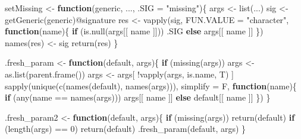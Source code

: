 \documentclass[
]{article}
\newenvironment{Shaded}{\begin{snugshade}}{\end{snugshade}}
\newcommand{\AttributeTok}[1]{\textcolor[rgb]{0.77,0.63,0.00}{#1}}
\newcommand{\ControlFlowTok}[1]{\textcolor[rgb]{0.13,0.29,0.53}{\textbf{#1}}}
\newcommand{\DecValTok}[1]{\textcolor[rgb]{0.00,0.00,0.81}{#1}}
\newcommand{\FunctionTok}[1]{\textcolor[rgb]{0.00,0.00,0.00}{#1}}
\newcommand{\NormalTok}[1]{#1}
\newcommand{\OtherTok}[1]{\textcolor[rgb]{0.56,0.35,0.01}{#1}}
\newcommand{\SpecialCharTok}[1]{\textcolor[rgb]{0.00,0.00,0.00}{#1}}
\newcommand{\StringTok}[1]{\textcolor[rgb]{0.31,0.60,0.02}{#1}}
\begin{document}
\begin{Shaded}
\begin{Highlighting}[]
\NormalTok{setMissing }\OtherTok{\textless{}{-}} 
  \ControlFlowTok{function}\NormalTok{(generic, ..., }\AttributeTok{.SIG =} \StringTok{"missing"}\NormalTok{)\{}
\NormalTok{    args }\OtherTok{\textless{}{-}} \FunctionTok{list}\NormalTok{(...)}
\NormalTok{    sig }\OtherTok{\textless{}{-}} \FunctionTok{getGeneric}\NormalTok{(generic)}\SpecialCharTok{@}\NormalTok{signature}
\NormalTok{    res }\OtherTok{\textless{}{-}} \FunctionTok{vapply}\NormalTok{(sig, }\AttributeTok{FUN.VALUE =} \StringTok{"character"}\NormalTok{,}
                  \ControlFlowTok{function}\NormalTok{(name)\{}
                    \ControlFlowTok{if}\NormalTok{ (}\FunctionTok{is.null}\NormalTok{(args[[ name ]]))}
\NormalTok{                      .SIG}
                    \ControlFlowTok{else}
\NormalTok{                      args[[ name ]]}
\NormalTok{                  \})}
    \FunctionTok{names}\NormalTok{(res) }\OtherTok{\textless{}{-}}\NormalTok{ sig}
    \FunctionTok{return}\NormalTok{(res)}
\NormalTok{  \}}

\NormalTok{.fresh\_param }\OtherTok{\textless{}{-}} 
  \ControlFlowTok{function}\NormalTok{(default, args)\{}
    \ControlFlowTok{if}\NormalTok{ (}\FunctionTok{missing}\NormalTok{(args))}
\NormalTok{      args }\OtherTok{\textless{}{-}} \FunctionTok{as.list}\NormalTok{(}\FunctionTok{parent.frame}\NormalTok{())}
\NormalTok{    args }\OtherTok{\textless{}{-}}\NormalTok{ args[ }\SpecialCharTok{!}\FunctionTok{vapply}\NormalTok{(args, is.name, T) ]}
    \FunctionTok{sapply}\NormalTok{(}\FunctionTok{unique}\NormalTok{(}\FunctionTok{c}\NormalTok{(}\FunctionTok{names}\NormalTok{(default), }\FunctionTok{names}\NormalTok{(args))),}
           \AttributeTok{simplify =}\NormalTok{ F,}
           \ControlFlowTok{function}\NormalTok{(name)\{}
             \ControlFlowTok{if}\NormalTok{ (}\FunctionTok{any}\NormalTok{(name }\SpecialCharTok{==} \FunctionTok{names}\NormalTok{(args)))}
\NormalTok{               args[[ name ]]}
             \ControlFlowTok{else}
\NormalTok{               default[[ name ]]}
\NormalTok{           \})}
\NormalTok{  \}}

\NormalTok{.fresh\_param2 }\OtherTok{\textless{}{-}} 
  \ControlFlowTok{function}\NormalTok{(default, args)\{}
    \ControlFlowTok{if}\NormalTok{ (}\FunctionTok{missing}\NormalTok{(args))}
      \FunctionTok{return}\NormalTok{(default)}
    \ControlFlowTok{if}\NormalTok{ (}\FunctionTok{length}\NormalTok{(args) }\SpecialCharTok{==} \DecValTok{0}\NormalTok{)}
      \FunctionTok{return}\NormalTok{(default)}
    \FunctionTok{.fresh\_param}\NormalTok{(default, args)}
\NormalTok{  \}}


\end{Highlighting}
\end{Shaded}
\end{document}

